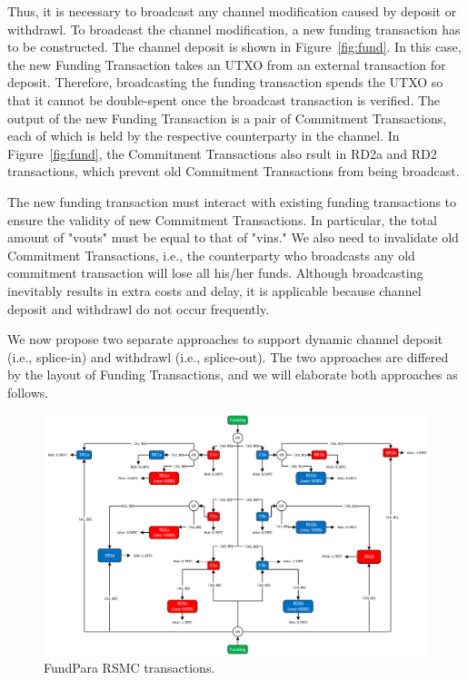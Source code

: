 Thus, it is necessary to broadcast any channel modification caused by deposit or
withdrawl. To broadcast the channel modification, a new funding transaction has to
be constructed. The channel deposit is shown in Figure~\ref{fig:fund}. In this case, the new Funding Transaction takes an UTXO from an external transaction for deposit. Therefore, broadcasting the funding transaction spends the UTXO so that it cannot be double-spent once the broadcast transaction is verified. The output of the new Funding Transaction is a pair of Commitment Transactions, each of which is held by the respective counterparty in the channel. In Figure~\ref{fig:fund}, the Commitment Transactions also rsult in RD2a and RD2 transactions, which prevent old Commitment Transactions from being broadcast.


The new funding transaction must interact with existing funding transactions to
ensure the validity of new Commitment Transactions. In particular, the total
amount of "vouts" must be equal to that of "vins." We also need to invalidate old Commitment Transactions, i.e., the counterparty who broadcasts any old commitment transaction will lose all his/her funds. Although broadcasting inevitably results in extra costs and delay, it is applicable because channel deposit and withdrawl do not occur frequently.


We now propose two separate approaches to support dynamic channel
deposit (i.e., splice-in) and withdrawl (i.e., splice-out). The two approaches are
differed by the layout of Funding Transactions, and we will elaborate both approaches as follows.

\begin{figure}[t]
\centering
\includegraphics[width=6in]{figs/rsmc_new.pdf}
\vspace{-6pt}
\caption{FundPara RSMC transactions.}
\label{fig:rsmc_new}
\end{figure}

